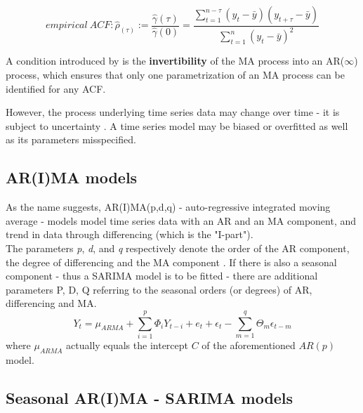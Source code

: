\documentclass[a4paper, 11pt]{article}
\begin{document}
\begin{equation}
empirical \ ACF: \hat{\rho}_(\tau) := \frac{\hat{\gamma}(\tau)}{\hat{\gamma}(0)} = \frac{\sum_{t = 1}^{n - \tau}(y_{t} - \bar{y})(y_{t + \tau}-\bar{y})}{\sum_{t = 1}^{n}(y_{t}-\bar{y})^2}
\end{equation}

A condition introduced by \cite{Box.1976} is the \textbf{invertibility} of the MA process into an AR($\infty$) process, which ensures that only one parametrization of an MA process can be identified for any ACF.

However, the process underlying time series data may change over time - it is subject to uncertainty \citep{Adhikari.2015}. A time series model may be biased or overfitted as well as its parameters misspecified. \\

\subsection{AR(I)MA models}

As the name suggests, AR(I)MA(p,d,q) - auto-regressive integrated moving average - models model time series data with an AR and an MA component, and trend in data through differencing (which is the "I-part"). \\
The parameters \textit{p}, \textit{d}, and \textit{q} respectively denote the order of the AR component, the degree of differencing and the MA component \citep{Zhao.07022018}.
If there is also a seasonal component - thus a SARIMA model is to be fitted - there are additional parameters P, D, Q referring to the seasonal orders (or degrees) of AR, differencing and MA.\\

\begin{equation}
Y_{t} =  \mu_{ARMA} +  \sum_{i = 1}^{p}\Phi_{i}Y_{t-i} + e_{t}  + \epsilon_{t} - \sum_{m = 1}^{q} \Theta_{m}\epsilon_{t-m} 
\end{equation}
where $\mu_{ARMA}$ actually equals the intercept $C$ of the aforementioned $AR(p)$ model.

\subsection{Seasonal AR(I)MA - SARIMA models}
\end{document}
